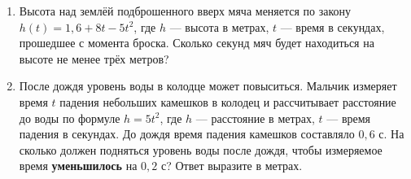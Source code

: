 \documentclass[a4paper,12pt]{article}
\begin{document}
\begin{enumerate}
\item Высота над землёй подброшенного вверх мяча меняется по закону $h(t)=1{,}6+8t-5t^2$, где $h$ --- высота в метрах, $t$ --- время в секундах, прошедшее с момента броска. Сколько секунд мяч будет находиться на высоте не менее трёх метров?
\item После дождя уровень воды в колодце может повыситься. Мальчик измеряет время $t$ падения небольших камешков в колодец и рассчитывает расстояние до воды по формуле $h=5t^2$, где $h$ --- расстояние в метрах, $t$ --- время падения в секундах. До дождя время падения камешков составляло $0{,}6$ с. На сколько должен подняться уровень воды после дождя, чтобы измеряемое время \textbf{уменьшилось} на $0{,}2$ с? Ответ выразите в метрах.
\end{enumerate}
\end{document}
